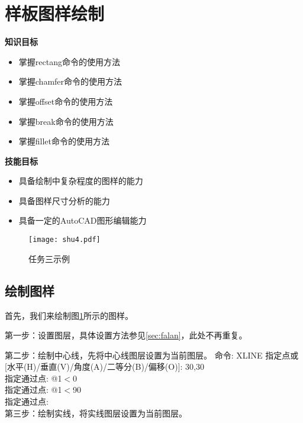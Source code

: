 \section{样板图样绘制}\label{sec:yangban}
{\bfseries 知识目标}
\begin{itemize}
\item 掌握rectang命令的使用方法
\item 掌握chamfer命令的使用方法
\item 掌握offset命令的使用方法
\item 掌握break命令的使用方法
\item 掌握fillet命令的使用方法
\end{itemize}
{\bfseries 技能目标}
\begin{itemize}
\item 具备绘制中复杂程度的图样的能力
\item 具备图样尺寸分析的能力
\item 具备一定的AutoCAD图形编辑能力
\end{itemize}
\begin{figure}[htbp]
\centering
\texttt{[image: shu4.pdf]}
\caption{任务三示例}\label{fig:renwu3}
\end{figure}
\subsection{绘制图样}
首先，我们来绘制图\ref{fig:renwu3}所示的图样。

第一步：设置图层，具体设置方法参见\ref{sec:falan}，此处不再重复。

第二步：绘制中心线，先将中心线图层设置为当前图层。
\noindent
命令: XLINE 指定点或 [水平(H)/垂直(V)/角度(A)/二等分(B)/偏移(O)]: 30,30\\
指定通过点: @1$<$0\\
指定通过点: @1$<$90\\
指定通过点:\\
\indent
第三步：绘制实线，将实线图层设置为当前图层。

